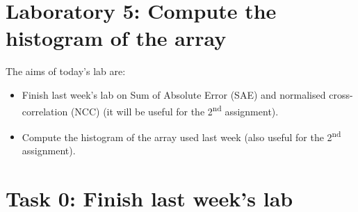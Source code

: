 \documentclass[english,a4paper,12pt,oneside]{article}
\begin{document}

\section*{Laboratory 5: Compute the histogram of the array}

%
%
%
%    
%    

The aims of today's lab are:
\begin{itemize}
	\item Finish last week's lab on Sum of Absolute Error (SAE) and normalised cross-correlation (NCC) (it will be useful for the 2\textsuperscript{nd} assignment).
	\item Compute the histogram of the array used last week (also useful for the 2\textsuperscript{nd} assignment). 
\end{itemize}

\section*{Task 0: Finish last week's lab}
\end{document}
